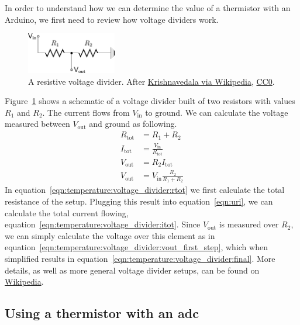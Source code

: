 In order to understand how we can determine the value of a thermistor with an Arduino, we first need to review how voltage dividers work. 
\begin{figure}[bt]
    \centering
    \includegraphics[width=0.35\textwidth]{graphics/03_temperature/resistive_divider.pdf}
    \caption{A resistive voltage divider. After \href{https://en.wikipedia.org/wiki/Voltage_divider\#/media/File:Resistive_divider2.svg}{Krishnavedala via Wikipedia}, \href{https://creativecommons.org/publicdomain/zero/1.0/deed.en}{CC0}.}
    \label{fig:temperature:voltage_divider}
\end{figure}
Figure~\ref{fig:temperature:voltage_divider} shows a schematic of a voltage divider built of two resistors with values $R_1$ and $R_2$. The current flows from $V_\mathrm{in}$ to ground. We can calculate the voltage measured between $V_\mathrm{out}$ and ground as following.
\begin{align}
    R_\mathrm{tot} &= R_1 + R_2 \label{eqn:temperature:voltage_divider:rtot} \\
    I_\mathrm{tot} &= \frac{V_\mathrm{in}}{R_\mathrm{tot}} \label{eqn:temperature:voltage_divider:itot} \\
    V_\mathrm{out} &= R_2 I_\mathrm{tot} \label{eqn:temperature:voltage_divider:vout_first_step}\\
    V_\mathrm{out} &= V_\mathrm{in} \frac{R_2}{R_1 + R_2} \label{eqn:temperature:voltage_divider:final}
\end{align} 
In equation~\eqref{eqn:temperature:voltage_divider:rtot} we first calculate the total resistance of the setup. Plugging this result into equation~\eqref{eqn:uri}, we can calculate the total current flowing, equation~\eqref{eqn:temperature:voltage_divider:itot}. Since $V_\mathrm{out}$ is measured over $R_2$, we can simply calculate the voltage over this element as in equation~\eqref{eqn:temperature:voltage_divider:vout_first_step}, which when simplified results in equation~\eqref{eqn:temperature:voltage_divider:final}. More details, as well as more general voltage divider setups, can be found on \href{https://en.wikipedia.org/wiki/Voltage_divider}{Wikipedia}.

\subsection{Using a thermistor with an \ac{adc}}


